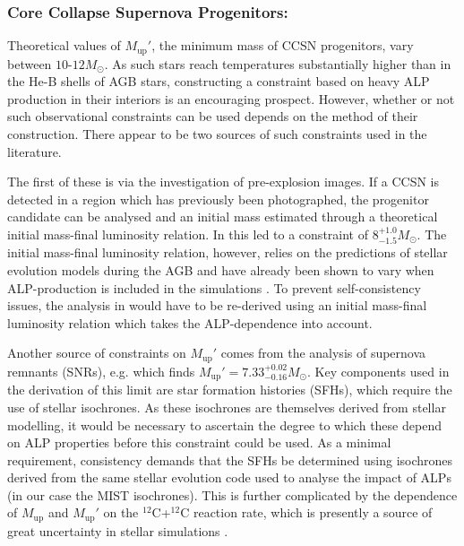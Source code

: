 \subsubsection*{Core Collapse Supernova Progenitors:}
Theoretical values of $M_{\mathrm{up}}'$, the minimum mass of CCSN progenitors, vary between $10$-$12M_{\odot}$. As such stars reach temperatures substantially higher than in the He-B shells of AGB stars, constructing a constraint based on heavy ALP production in their interiors is an encouraging prospect. However, whether or not such observational constraints can be used depends on the method of their construction. There appear to be two sources of such constraints used in the literature.


The first of these is via the investigation of pre-explosion images. If a CCSN is detected in a region which has previously been photographed, the progenitor candidate can be analysed and an initial mass estimated through a theoretical initial mass-final luminosity relation. In \cite{Smartt2009} this led to a constraint of $8^{+1.0}_{-1.5}M_{\odot}$. The initial mass-final luminosity relation, however, relies on the predictions of stellar evolution models during the AGB and have already been shown to vary when ALP-production is included in the simulations \cite{Straniero:2019dtm}. To prevent self-consistency issues, the analysis in \cite{Smartt2009} would have to be re-derived using an initial mass-final luminosity relation which takes the ALP-dependence into account.




Another source of constraints on $M_{\mathrm{up}}'$ comes from the analysis of supernova remnants (SNRs), e.g. \cite{Diaz-Rodriguez2018-SNRs} which finds $M_{\mathrm{up}}'=7.33^{+0.02}_{-0.16}M_{\odot}$. Key components used in the derivation of this limit are star formation histories (SFHs), which require the use of stellar isochrones. As these isochrones are themselves derived from stellar modelling, it would be necessary to ascertain the degree to which these depend on ALP properties before this constraint could be used. As a minimal requirement, consistency demands that the SFHs be determined using isochrones derived from the same stellar evolution code used to analyse the impact of ALPs (in our case the MIST isochrones). This is further complicated by the dependence of $M_{\mathrm{up}}$ and $M_{\mathrm{up}}'$ on the $^{12}$C+$^{12}$C reaction rate, which is presently a source of great uncertainty in stellar simulations \cite{inbook}.

